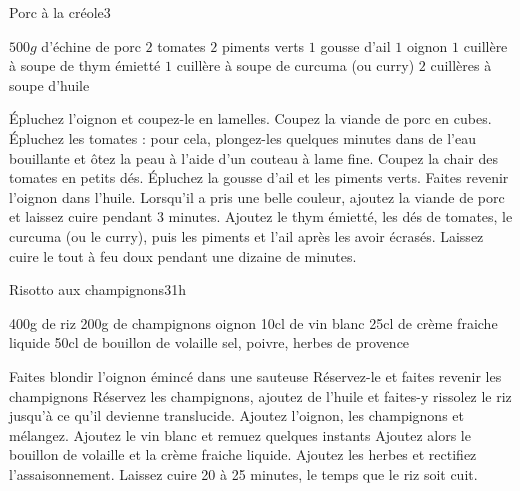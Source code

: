\begin{recette}{Porc à la créole}{3}{}{}%
\begin{ingredients}
\ingredient $500 \unit{g}$ d'échine de porc
\ingredient $2$ tomates
\ingredient $2$ piments verts
\ingredient $1$ gousse d'ail
\ingredient $1$ oignon
\ingredient $1$ cuillère à soupe de thym émietté
\ingredient $1$ cuillère à soupe de curcuma (ou curry)
\ingredient $2$ cuillères à soupe d'huile
\end{ingredients}

\begin{preparation}
\etape Épluchez l'oignon et coupez-le en lamelles.
\etape Coupez la viande de porc en cubes.
\etape Épluchez les tomates : pour cela, plongez-les quelques minutes dans de l'eau bouillante et ôtez la peau à l'aide d'un couteau à lame fine.
\etape Coupez la chair des tomates en petits dés.
\etape Épluchez la gousse d'ail et les piments verts.
\etape Faites revenir l'oignon dans l'huile.
\etape Lorsqu'il a pris une belle couleur, ajoutez la viande de porc et laissez cuire pendant 3 minutes.
\etape Ajoutez le thym émietté, les dés de tomates, le curcuma (ou le curry), puis les piments et l'ail après les avoir écrasés.
\etape Laissez cuire le tout à feu doux pendant une dizaine de minutes.
\end{preparation}

\end{recette}

\begin{recette}{Risotto aux champignons}{3}{1h}{}
\begin{ingredients}
\ingredient 400g de riz
\ingredient 200g de champignons
 oignon
\ingredient 10cl de vin blanc
\ingredient 25cl de crème fraiche liquide
\ingredient 50cl de bouillon de volaille
\ingredient sel, poivre, herbes de provence
\end{ingredients}

\begin{preparation}
\etape Faites blondir l'oignon émincé dans une sauteuse
\etape Réservez-le et faites revenir les champignons
\etape Réservez les champignons, ajoutez de l'huile et faites-y rissolez le riz jusqu'à ce qu'il devienne translucide.
\etape Ajoutez l'oignon, les champignons et mélangez.
\etape Ajoutez le vin blanc et remuez quelques instants 
\etape Ajoutez alors le bouillon de volaille et la crème fraiche liquide. 
\etape Ajoutez les herbes et rectifiez l'assaisonnement.
\etape Laissez cuire 20 à 25 minutes, le temps que le riz soit cuit. 
\end{preparation}

\end{recette}

